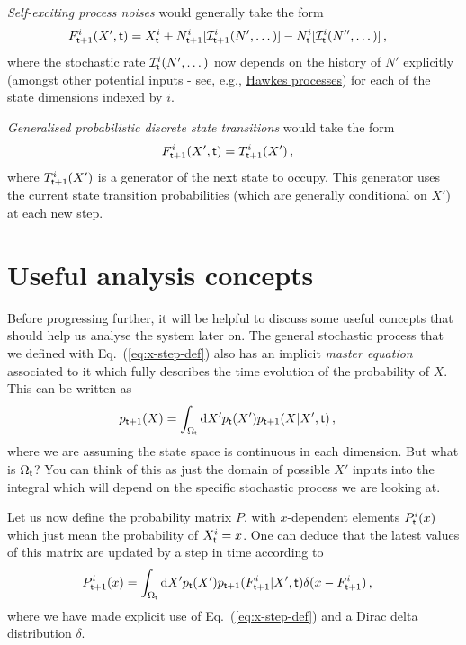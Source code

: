 \documentclass{book}
\begin{document}
\emph{Self-exciting process noises} would generally take the form
\begin{align}
& F^{i}_{{\sf t}+1}(X',{\sf t}) = X^i_{\sf t} + N^i_{{\sf t}+1}[{\cal I}^i_{{\sf t}+1}(N', \dots)]-N^i_{\sf t}[{\cal I}^i_{\sf t}(N'', \dots)]\,,
\end{align}
where the stochastic rate ${\cal I}^i_{\sf t}(N', \dots)$ now depends on the history of $N'$ explicitly (amongst other potential inputs - see, e.g., \href{https://en.wikipedia.org/wiki/Hawkes_process}{Hawkes processes}) for each of the state dimensions indexed by $i$.

\emph{Generalised probabilistic discrete state transitions} would take the form
\begin{align}
& F^{i}_{{\sf t}+1}(X',{\sf t}) = T^i_{{\sf t}+1}(X')\,,
\end{align}
where $T^i_{{\sf t}+1}(X')$ is a generator of the next state to occupy. This generator uses the current state transition probabilities (which are generally conditional on $X'$) at each new step.

\section{\sffamily Useful analysis concepts}

Before progressing further, it will be helpful to discuss some useful concepts that should help us analyse the system later on. The general stochastic process that we defined with Eq.~(\ref{eq:x-step-def}) also has an implicit \emph{master equation} associated to it which fully describes the time evolution of the probability of $X$. This can be written as
\begin{align}
p_{{\sf t}+1}(X) &= \int_{\Omega_{\sf t}}{\rm d}X' p_{\sf t}(X') p_{{\sf t}+1}(X\vert X',{\sf t}) \label{eq:master-x-cont} \,,
\end{align}
where we are assuming the state space is continuous in each dimension. But what is $\Omega_{\sf t}$? You can think of this as just the domain of possible $X'$ inputs into the integral which will depend on the specific stochastic process we are looking at.

Let us now define the probability matrix $P$, with $x$-dependent elements $P^i_{\sf t}(x)$ which just mean the probability of $X^i_{\sf t}=x$. One can deduce that the latest values of this matrix are updated by a step in time according to
\begin{align}
P^i_{{\sf t}+1}(x) &= \int_{\Omega_{\sf t}}{\rm d}X' p_{\sf t}(X') p_{{\sf t}+1}(F^i_{{\sf t}+1}|X',{\sf t}) \delta (x-F^i_{{\sf t}+1}) \label{eq:master-x-cont-update}\,,
\end{align}
where we have made explicit use of Eq.~(\ref{eq:x-step-def}) and a Dirac delta distribution $\delta$.
\end{document}
